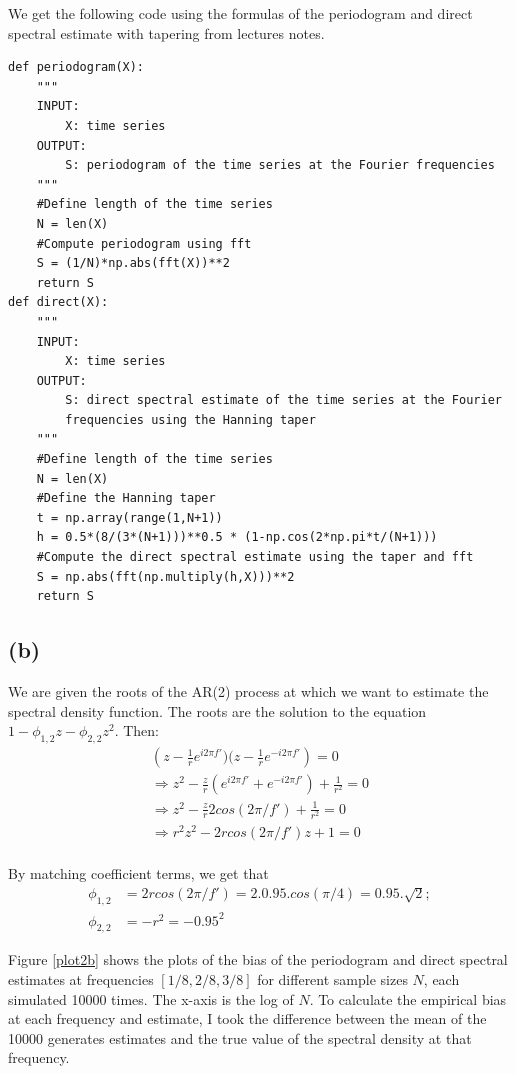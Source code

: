 \documentclass[a4paper,10pt]{article}
\theoremstyle{mytheor}
\begin{document}
We get the following code using the formulas of the periodogram and direct spectral estimate with tapering from lectures notes.

\begin{lstlisting}
def periodogram(X):
    """
    INPUT:
        X: time series
    OUTPUT:
        S: periodogram of the time series at the Fourier frequencies
    """
    #Define length of the time series
    N = len(X)
    #Compute periodogram using fft
    S = (1/N)*np.abs(fft(X))**2
    return S
def direct(X):
    """
    INPUT:
        X: time series
    OUTPUT:
        S: direct spectral estimate of the time series at the Fourier 
        frequencies using the Hanning taper 
    """
    #Define length of the time series
    N = len(X)
    #Define the Hanning taper
    t = np.array(range(1,N+1))
    h = 0.5*(8/(3*(N+1)))**0.5 * (1-np.cos(2*np.pi*t/(N+1)))
    #Compute the direct spectral estimate using the taper and fft
    S = np.abs(fft(np.multiply(h,X)))**2
    return S
\end{lstlisting}

\subsection*{(b)}
We are given the roots of the AR(2) process at which we want to estimate the spectral density function. The roots are the solution to the equation $1-\phi_{1,2}z - \phi_{2,2}z^2$. Then:
\begin{align*}
    \left(z-\frac{1}{r}e^{i2\pi f'})(z-\frac{1}{r}e^{-i2\pi f'}\right) = 0 \\
    \Longrightarrow z^2 -\frac{z}{r}(e^{i2\pi f'} + e^{-i2\pi f'}) + \frac{1}{r^2} = 0 \\
    \Longrightarrow z^2 -\frac{z}{r}2cos(2\pi/f') + \frac{1}{r^2} = 0 \\
     \Longrightarrow r^2z^2 -2rcos(2\pi/f')z + 1 = 0 \\
\end{align*}

By matching coefficient terms, we get that 
\begin{align*}
    \phi_{1,2} & = 2rcos(2\pi/f') = 2.0.95.cos(\pi/4) = 0.95.\sqrt{2}; \\
    \phi_{2,2} & = -r^2 = -0.95^2
\end{align*}

Figure \ref{plot2b} shows the plots of the bias of the periodogram and direct spectral estimates at frequencies $[1/8,2/8,3/8]$ for different sample sizes $N$, each simulated 10000 times. The x-axis is the log of $N$. To calculate the empirical bias at each frequency and estimate, I took the difference between the mean of the 10000 generates estimates and the true value of the spectral density at that frequency.
\end{document}
